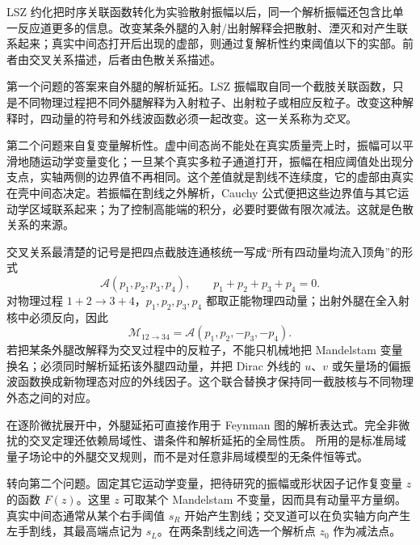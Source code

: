 LSZ 约化把时序关联函数转化为实验散射振幅以后，同一个解析振幅还包含比单一反应道更多的信息。改变某条外腿的入射/出射解释会把散射、湮灭和对产生联系起来；真实中间态打开后出现的虚部，则通过复解析性约束阈值以下的实部。前者由交叉关系描述，后者由色散关系描述。

第一个问题的答案来自外腿的解析延拓。LSZ 振幅取自同一个截肢关联函数，只是不同物理过程把不同外腿解释为入射粒子、出射粒子或相应反粒子。改变这种解释时，四动量的符号和外线波函数必须一起改变。这一关系称为\emph{交叉}。

第二个问题来自复变量解析性。虚中间态尚不能处在真实质量壳上时，振幅可以平滑地随运动学变量变化；一旦某个真实多粒子通道打开，振幅在相应阈值处出现分支点，实轴两侧的边界值不再相同。这个差值就是割线不连续度，它的虚部由真实在壳中间态决定。若振幅在割线之外解析，Cauchy 公式便把这些边界值与其它运动学区域联系起来；为了控制高能端的积分，必要时要做有限次减法。这就是色散关系的来源。

交叉关系最清楚的记号是把四点截肢连通核统一写成“所有四动量均流入顶角”的形式
\begin{equation}
 \mathcal A(p_1,p_2,p_3,p_4),
 \qquad
 p_1+p_2+p_3+p_4=0.
 \label{eq:all-incoming-amplitude-dp9}
\end{equation}
对物理过程 $1+2\to3+4$，$p_1,p_2,p_3,p_4$ 都取正能物理四动量；出射外腿在全入射核中必须反向，因此
\begin{equation}
 \boxed{
 \mathcal M_{12\to34}
 =\mathcal A(p_1,p_2,-p_3,-p_4).}
 \label{eq:physical-from-all-incoming-dp9}
\end{equation}
若把某条外腿改解释为交叉过程中的反粒子，不能只机械地把 Mandelstam 变量换名；必须同时解析延拓该外腿四动量，并把 Dirac 外线的 $u$、$v$ 或矢量场的偏振波函数换成新物理态对应的外线因子。这个联合替换才保持同一截肢核与不同物理外态之间的对应。

\begin{note}[交叉关系的使用范围]
在逐阶微扰展开中，外腿延拓可直接作用于 Feynman 图的解析表达式。完全非微扰的交叉定理还依赖局域性、谱条件和解析延拓的全局性质。 所用的是标准局域量子场论中的外腿交叉规则，而不是对任意非局域模型的无条件恒等式。
\end{note}

转向第二个问题。固定其它运动学变量，把待研究的振幅或形状因子记作复变量 $z$ 的函数 $F(z)$。这里 $z$ 可取某个 Mandelstam 不变量，因而具有动量平方量纲。真实中间态通常从某个右手阈值 $s_R$ 开始产生割线；交叉道可以在负实轴方向产生左手割线，其最高端点记为 $s_L$。在两条割线之间选一个解析点 $z_0$ 作为减法点。

